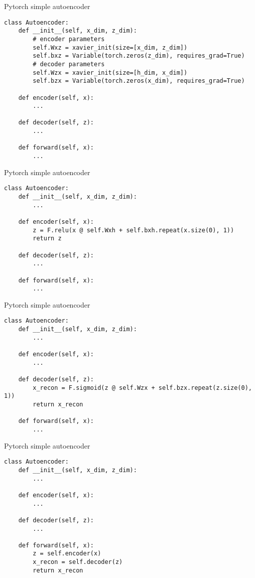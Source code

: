 \documentclass{beamer}
\begin{document}
\begin{frame}[fragile]{Pytorch simple autoencoder}
\begin{verbatim}
class Autoencoder:
    def __init__(self, x_dim, z_dim):
        # encoder parameters
        self.Wxz = xavier_init(size=[x_dim, z_dim])
        self.bxz = Variable(torch.zeros(z_dim), requires_grad=True)
        # decoder parameters
        self.Wzx = xavier_init(size=[h_dim, x_dim])
        self.bzx = Variable(torch.zeros(x_dim), requires_grad=True)

    def encoder(self, x):
        ...
	
    def decoder(self, z):
        ...
    
    def forward(self, x):
        ...
\end{verbatim}
\end{frame}

\begin{frame}[fragile]{Pytorch simple autoencoder}
\begin{verbatim}
class Autoencoder:
    def __init__(self, x_dim, z_dim):
        ...
	
    def encoder(self, x):
        z = F.relu(x @ self.Wxh + self.bxh.repeat(x.size(0), 1))
        return z
        
    def decoder(self, z):
        ...
	
    def forward(self, x):
	    ...
\end{verbatim}
\end{frame}

\begin{frame}[fragile]{Pytorch simple autoencoder}
\begin{verbatim}
class Autoencoder:
    def __init__(self, x_dim, z_dim):
        ...
	
    def encoder(self, x):
        ...
	
    def decoder(self, z):
        x_recon = F.sigmoid(z @ self.Wzx + self.bzx.repeat(z.size(0), 1))
        return x_recon
	
    def forward(self, x):
        ...
\end{verbatim}
\end{frame}

\begin{frame}[fragile]{Pytorch simple autoencoder}
\begin{verbatim}
class Autoencoder:
    def __init__(self, x_dim, z_dim):
        ...
	
    def encoder(self, x):
        ...
	
    def decoder(self, z):
        ...
	
    def forward(self, x):
        z = self.encoder(x)
        x_recon = self.decoder(z)
        return x_recon
\end{verbatim}
\end{frame}
\end{document}
